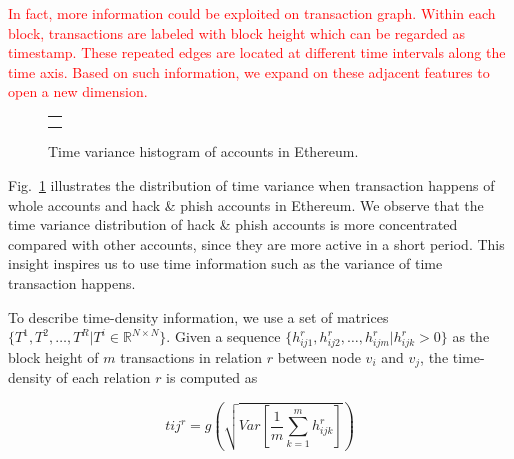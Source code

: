 
\textcolor{red}{In fact, more information could be exploited on transaction graph. Within each block, transactions are labeled with block height which can be regarded as timestamp. These repeated edges are located at different time intervals along the time axis. Based on such information, we expand on these adjacent features to open a new dimension.}


 
\begin{figure}[htbp]
\centering
\begin{tabular}{c}
	\subfigure[Time variance histogram of whole nodes.]{
		\label{fig:high_order}
    
	}\\
	\subfigure[Time variance histogram of hack\&phish nodes.]{
		\label{fig:asymmetric}
    
	}
\end{tabular}
\caption{Time variance histogram of accounts in Ethereum.}
\label{fig:time_std}
\end{figure}

Fig.~\ref{fig:time_std} illustrates the distribution of time variance when transaction happens of whole accounts and hack \& phish accounts in Ethereum. We observe that the time variance distribution of hack \& phish accounts is more concentrated compared with other accounts, since they are more active in a short period. This insight inspires us to use time information such as the variance of time transaction happens.

To describe time-density information, we use a set of matrices $\{T^1,T^2,\dots,T^R|T^i\in \mathbb{R}^{N \times N}\}$. Given a sequence $\{h_{ij1}^r,h_{ij2}^r,\dots,h_{ijm}^r | h_{ijk}^r>0\}$ as the block height of $m$ transactions in relation $r$ between node $v_i$ and $v_j$, the time-density of each relation $r$ is computed as%

\begin{equation}
t{ij}^r=g(\sqrt{Var[\frac{1}{m}\sum_{k=1}^m h_{ijk}^r]})
\label{eq:time}
\end{equation}

